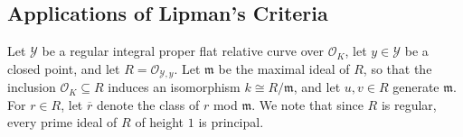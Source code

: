 \documentclass[12pt]{amsart}
\numberwithin{equation}{section}
\newtheorem{lemma}[equation]{Lemma}
\theoremstyle{definition}
\renewcommand{\O}{\mathcal{O}}
\renewcommand{\c}[1]{\overline{#1}}
\newcommand{\m}{\mathfrak{m}}
\newcommand{\Y}{\mathcal{Y}}
\begin{document}

\subsection{Applications of Lipman's Criteria}\label{subsection 5.2}\hfill

Let $\Y$ be a regular integral proper flat relative curve over $\O_K$, let $y\in\Y$ be a closed point, and let $R=\O_{\Y,y}$. Let $\m$ be the maximal ideal of $R$, so that the inclusion $\O_K\subseteq R$ induces an isomorphism $k\cong R/\m$, and let $u,v\in R$ generate $\m$. For $r\in R$, let $\c{r}$ denote the class of $r$ mod $\m$. We note that since $R$ is regular, every prime ideal of $R$ of height $1$ is principal.
\end{document}
